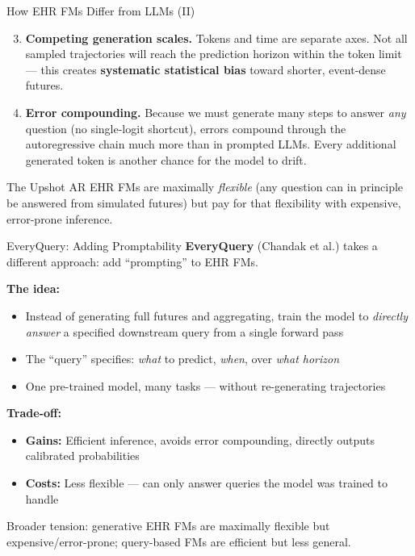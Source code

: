 \documentclass[aspectratio=169,10pt]{beamer}
\begin{document}
\begin{frame}{How EHR FMs Differ from LLMs (II)}
\begin{enumerate}
    \setcounter{enumi}{2}
    \item<+-> \textbf{Competing generation scales.} Tokens and time are separate axes. Not all sampled trajectories will reach the prediction horizon within the token limit --- this creates \textbf{systematic statistical bias} toward shorter, event-dense futures.

    \item<+-> \textbf{Error compounding.} Because we must generate many steps to answer \emph{any} question (no single-logit shortcut), errors compound through the autoregressive chain much more than in prompted LLMs. Every additional generated token is another chance for the model to drift.
\end{enumerate}

\vspace{0.3em}
\begin{block}{The Upshot}
AR EHR FMs are maximally \emph{flexible} (any question can in principle be answered from simulated futures) but pay for that flexibility with expensive, error-prone inference.
\end{block}
\end{frame}

\begin{frame}{EveryQuery: Adding Promptability}
\textbf{EveryQuery} (Chandak et al.) takes a different approach: add ``prompting'' to EHR FMs.
\vspace{0.2em}

\textbf{The idea:}
\begin{itemize}[<+->]
    \item Instead of generating full futures and aggregating, train the model to \emph{directly answer} a specified downstream query from a single forward pass
    \item The ``query'' specifies: \emph{what} to predict, \emph{when}, over \emph{what horizon}
    \item One pre-trained model, many tasks --- without re-generating trajectories
\end{itemize}

\pause
\vspace{0.2em}
\textbf{Trade-off:}
\begin{itemize}
    \item \textbf{Gains:} Efficient inference, avoids error compounding, directly outputs calibrated probabilities
    \item \textbf{Costs:} Less flexible --- can only answer queries the model was trained to handle
\end{itemize}
\vspace{0.2em}
\alert{Broader tension:} generative EHR FMs are maximally flexible but expensive/error-prone; query-based FMs are efficient but less general.
\end{frame}
\end{document}
